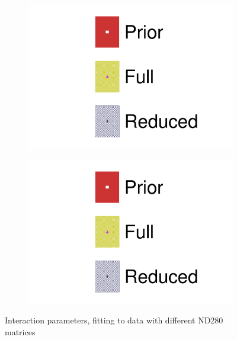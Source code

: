 \begin{figure}[h]
	\begin{subfigure}[t]{0.49\textwidth}
		\includegraphics[width=\textwidth,page=20, trim={0mm 0mm 0mm 9mm}, clip]{figures/mach3/2018/data/2018a_FixedCov_FullCov_Mpi_Data_merg_2018a_FixedCov_RedCov_Mpi_Data_merge}
	\end{subfigure}
	\begin{subfigure}[t]{0.49\textwidth}
		\includegraphics[width=\textwidth,page=21, trim={0mm 0mm 0mm 9mm}, clip]{figures/mach3/2018/data/2018a_FixedCov_FullCov_Mpi_Data_merg_2018a_FixedCov_RedCov_Mpi_Data_merge}
	\end{subfigure}
	\caption{Interaction parameters, fitting to data with different ND280 matrices}
	\label{fig:data_full_red_xsec}
\end{figure}

